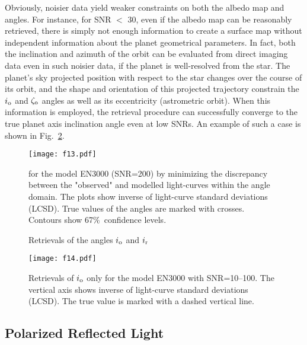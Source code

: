 \documentclass{emulateapj}
\begin{document}
Obviously, noisier data yield weaker constraints on both the albedo map and angles. 
For instance, for SNR $<$ 30, even if the albedo map can be reasonably retrieved,
there is simply not enough information to create a surface map without independent 
information about the planet geometrical parameters.
In fact, both the inclination 
and azimuth  of the orbit can be evaluated from direct imaging data even in such noisier data, 
if the planet is well-resolved from the star. The planet's sky projected position with respect 
to the star changes over the course of its orbit, and the shape and orientation
of this projected trajectory constrain the  $i_{\rm o}$ and $\zeta_{\rm o}$
angles as well as its eccentricity (astrometric orbit). When this information
is employed, the retrieval procedure can successfully converge to the true
planet axis inclination angle even at low SNRs. An example of such a case is
shown in Fig.~\ref{fig:retr_sn_i}.

\begin{figure}
\centering
\texttt{[image: f13.pdf]}
\caption{Retrievals of the angles  $i_{\rm o}$ and $i_{\rm r}$} for the model EN3000 (SNR=200)
by minimizing the discrepancy between the "observed" and modelled light-curves within the angle domain.
The plots show inverse of light-curve standard deviations (LCSD). 
True values of the angles are marked with crosses. 
Contours show 67\%\ confidence levels. 
\label{fig:retr_sn200}
\end{figure}

\begin{figure}
\centering
\texttt{[image: f14.pdf]}
\caption{Retrievals of $i_{\rm o}$ only for the model EN3000 with SNR=10--100. 
The vertical axis shows inverse of light-curve standard deviations (LCSD). 
The true value is marked with a dashed vertical line.}
\label{fig:retr_sn_i}
\end{figure}

\subsection{Polarized Reflected Light}\label{sec:pol}
\end{document}
